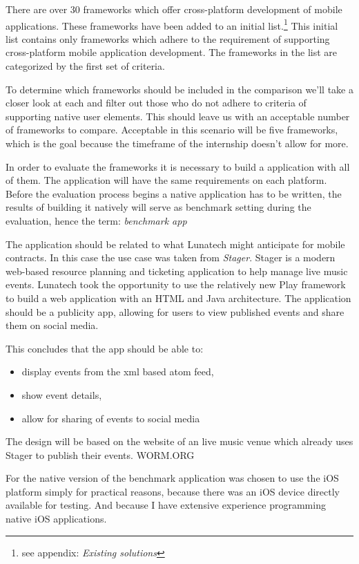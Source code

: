 There are over 30 frameworks which offer cross-platform development of mobile applications\cite{Wikipedia2012}. These frameworks have been added to an initial list.\footnote{see appendix: \emph{Existing solutions}} This initial list contains only frameworks which adhere to the requirement of supporting cross-platform mobile application development. The frameworks in the list are categorized by the first set of criteria.

To determine which frameworks should be included in the comparison we'll take a closer look at each and filter out those who do not adhere to criteria of supporting native user elements. This should leave us with an acceptable number of frameworks to compare. Acceptable in this scenario will be five frameworks, which is the goal because the timeframe of the internship doesn't allow for more.



In order to evaluate the frameworks it is necessary to build a application with all of them. The application will have the same requirements on each platform. Before the evaluation process begins a native application has to be written, the results of building it natively will serve as benchmark setting during the evaluation, hence the term: \emph{benchmark app}

The application should be related to what Lunatech might anticipate for mobile contracts. In this case the use case was taken from \emph{Stager}. Stager is a modern web-based resource planning and ticketing application to help manage live music events. Lunatech took the opportunity to use the relatively new Play framework to build a web application with an HTML and Java architecture. The application should be a publicity app, allowing for users to view published events and share them on social media.

This concludes that the app should be able to:
\begin{itemize}
	\item display events from the xml based atom feed,
	\item show event details,
	\item allow for sharing of events to social media
\end{itemize}
The design will be based on the website of an live music venue which already uses Stager to publish their events. WORM.ORG

For the native version of the benchmark application was chosen to use the iOS platform simply for practical reasons, because there was an iOS device directly available for testing. And because I have extensive experience programming native iOS applications.


